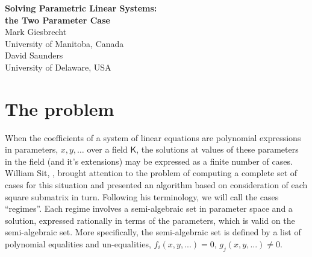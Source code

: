\documentclass[10pt]{article}
\begin{document}
\begin{center}
\Large{\bf Solving Parametric Linear Systems:\\
the Two Parameter Case} \\[10pt]
Mark Giesbrecht\\
University of Manitoba, Canada\\[5pt]
David Saunders \\
University of Delaware, USA \\
\end{center}

\newtheorem{theorem}{Theorem:}
\newcommand{\jog}{{$~$\indent$~$\indent$~$}}
\newcommand{\jogg}{{\jog\jog}}
\newcommand{\bc}{{$[$}}
\newcommand{\ec}{{$]$}}
\newcommand{\F}{{\mathsf F}}
\newcommand{\K}{{\mathsf K}}
\newcommand{\ints}{{\mathbf Z}}
\newcommand{\RR}{{\cal R}}
\newcommand{\Regime}{{\mbox{Regime}}}
\newcommand{\StPLS}{{SolveTwoParameterLinearSystem$~$}}
\newcommand{\alg}{{\cal A}}
\newcommand{\breg}{\left\{\begin{array}{c}}
\newcommand{\ereg}{\end{array}\right\}}
\newcommand{\implies}{{~~\Rightarrow~~}}
\newcommand{\mxn}{{m\times n}}
\newcommand{\nxn}{{n\times n}}
\newcommand{\kxk}{{k\times k}}
\newcommand{\nx}[1]{{n\times #1}}
\newcommand{\mx}[1]{{m\times #1}}
\newcommand{\rx}[1]{{r\times #1}}
\newcommand{\for}{~\mbox{for}~}
\newcommand{\diag}{~\mbox{diag}~}
\newcommand{\sqfr}{~\mbox{sqfr}~}
\newcommand{\und}{~\mbox{and}~}
\newcommand{\given}{~\mbox{if}~}
\newcommand{\nequiv}{{\mskip4mu\not\equiv\mskip4mu}}
\def\nin{{\mathrel{\hbox{$\mskip4mu\not\in\mskip4mu$}}}}

\section{The problem}

When the coefficients of a system of linear equations are polynomial
expressions in parameters, $x, y, \ldots $ over a field $\K$, the solutions at values of
these parameters in the field (and it's extensions) may be expressed as a 
finite number of
cases.  William Sit, \cite{Sit}, brought attention to the problem of computing a complete set of cases for
this situation and presented an algorithm based on consideration of each square submatrix
in turn.  Following his terminology, we will call the cases  ``regimes''.  Each regime
involves a semi-algebraic set in parameter space and a solution, expressed
rationally in terms of the parameters, which is valid on the semi-algebraic set.
More specifically, the semi-algebraic set is defined by 
a list of polynomial equalities and un-equalities, 
$f_i(x,y, ...) = 0$, $g_j(x,y, ...) \ne 0$.
\end{document}
